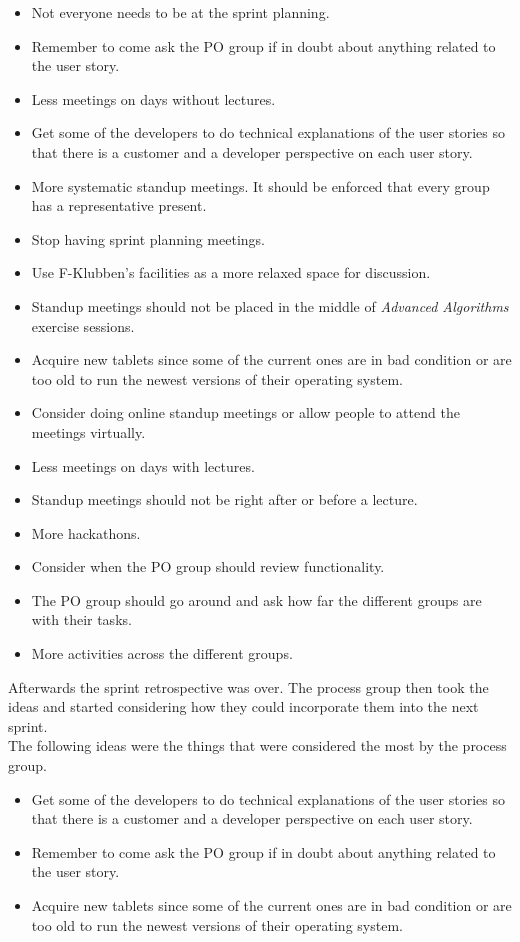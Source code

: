 \begin{itemize}
    \item Not everyone needs to be at the sprint planning.
    \item Remember to come ask the PO group if in doubt about anything related to the user story.
    \item Less meetings on days without lectures.
    \item Get some of the developers to do technical explanations of the user stories so that there is a customer and a developer perspective on each user story.
    \item More systematic standup meetings. It should be enforced that every group has a representative present.
    \item Stop having sprint planning meetings.
    \item Use F-Klubben's facilities as a more relaxed space for discussion. 
    \item Standup meetings should not be placed in the middle of \textit{Advanced Algorithms} exercise sessions.
    \item Acquire new tablets since some of the current ones are in bad condition or are too old to run the newest versions of their operating system.
    \item Consider doing online standup meetings or allow people to attend the meetings virtually.
    \item Less meetings on days with lectures.
    \item Standup meetings should not be right after or before a lecture.
    \item More hackathons.
    \item Consider when the PO group should review functionality. 
    \item The PO group should go around and ask how far the different groups are with their tasks.
    \item More activities across the different groups.
\end{itemize}
Afterwards the sprint retrospective was over.
The process group then took the ideas and started considering how they could incorporate them into the next sprint.
\\
\noindent
The following ideas were the things that were considered the most by the process group.
\begin{itemize}
    \item Get some of the developers to do technical explanations of the user stories so that there is a customer and a developer perspective on each user story.
    \item Remember to come ask the PO group if in doubt about anything related to the user story.
    \item Acquire new tablets since some of the current ones are in bad condition or are too old to run the newest versions of their operating system.
\end{itemize}
